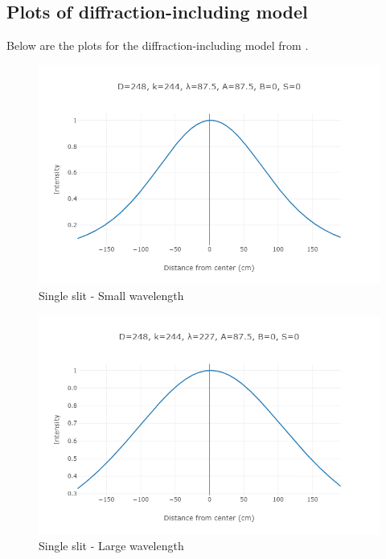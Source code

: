 \documentclass{paper}
\begin{document}
\begin{appendices}
\section{Plots of diffraction-including model}
\label{appendix:diffraction-plots}
\setcounter{equation}{0}
\renewcommand*{\thepage}{C\arabic{page}}
\renewcommand{\theequation}{C.\arabic{equation}}

\setcounter{figure}{0}
\renewcommand{\thefigure}{C.\arabic{figure}}

Below are the plots for the diffraction-including model from .

\begin{figure}[H]
    \caption{Single slit - Small wavelength}
    \includegraphics{diagrams/diffraction/single-slit-small-lambda.png}
\end{figure}

\begin{figure}[H]
    \caption{Single slit - Large wavelength}
    \includegraphics{diagrams/diffraction/single-slit-large-lambda.png}
\end{figure}


\end{appendices}
\end{document}
